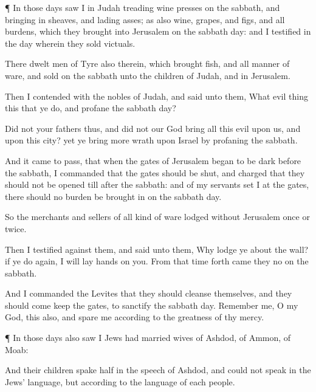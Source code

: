 {\par }{\PP {}¶ In those
days
saw I in
Judah
{}
treading wine
presses on the
sabbath, and bringing
in
sheaves, and
lading
asses; as also
wine,
grapes, and
figs, and all
{}
burdens, which they
brought into
Jerusalem on the
sabbath
day: and I
testified
{} in the
day wherein they
sold
victuals.

There
dwelt men of
Tyre also therein, which
brought
fish, and all manner of
ware, and
sold on the
sabbath unto the
children of
Judah, and in
Jerusalem.

Then I
contended with the
nobles of
Judah, and
said unto them, What
evil
thing
{} this that ye
do, and
profane the
sabbath
day?

Did not your
fathers thus, and
did not our
God
bring all this
evil upon us, and upon this
city? yet ye
bring
more
wrath upon
Israel by
profaning the
sabbath.

And it came to pass, that when the
gates of
Jerusalem began to be
dark
before the
sabbath, I
commanded that the
gates should be
shut, and
charged that they should not be
opened till
after the
sabbath: and
{} of my
servants
set I at the
gates,
{} there should no
burden be brought
in on the
sabbath
day.

So the
merchants and
sellers of all kind of
ware
lodged
without
Jerusalem
once or
twice.

Then I
testified against them, and
said unto them, Why
lodge ye
about the
wall? if ye do
{}
again, I will
lay
hands on you. From that
time forth
came they no
{} on the
sabbath.

And I
commanded the
Levites that they should
cleanse themselves, and
{} they should
come
{}
keep the
gates, to
sanctify the
sabbath
day.
Remember me, O my
God,
{} this also, and
spare me according to the
greatness of thy
mercy.


\par }{\PP {}¶ In those
days also
saw I
Jews
{} had
married
wives of
Ashdod, of
Ammon,
{} of
Moab:

And their
children
spake
half in the speech of
Ashdod, and
could not
speak in the
Jews’ language, but according to the
language of
each
people.

}
